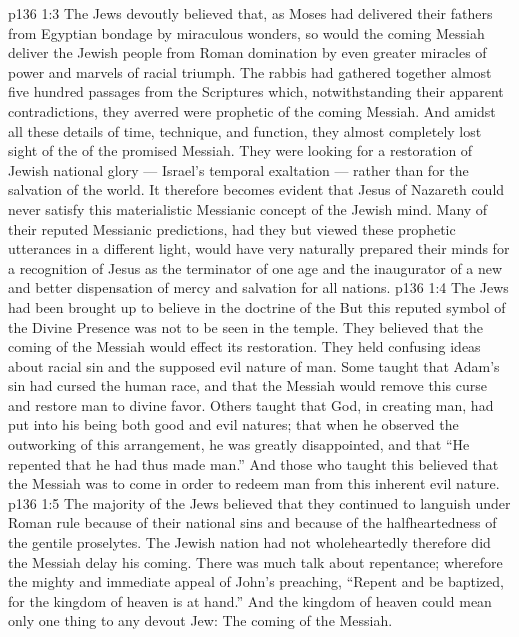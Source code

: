 \vs p136 1:3 The Jews devoutly believed that, as Moses had delivered their fathers from Egyptian bondage by miraculous wonders, so would the coming Messiah deliver the Jewish people from Roman domination by even greater miracles of power and marvels of racial triumph. The rabbis had gathered together almost five hundred passages from the Scriptures which, notwithstanding their apparent contradictions, they averred were prophetic of the coming Messiah. And amidst all these details of time, technique, and function, they almost completely lost sight of the  of the promised Messiah. They were looking for a restoration of Jewish national glory --- Israel’s temporal exaltation --- rather than for the salvation of the world. It therefore becomes evident that Jesus of Nazareth could never satisfy this materialistic Messianic concept of the Jewish mind. Many of their reputed Messianic predictions, had they but viewed these prophetic utterances in a different light, would have very naturally prepared their minds for a recognition of Jesus as the terminator of one age and the inaugurator of a new and better dispensation of mercy and salvation for all nations.
\vs p136 1:4 \pc The Jews had been brought up to believe in the doctrine of the  But this reputed symbol of the Divine Presence was not to be seen in the temple. They believed that the coming of the Messiah would effect its restoration. They held confusing ideas about racial sin and the supposed evil nature of man. Some taught that Adam’s sin had cursed the human race, and that the Messiah would remove this curse and restore man to divine favor. Others taught that God, in creating man, had put into his being both good and evil natures; that when he observed the outworking of this arrangement, he was greatly disappointed, and that “He repented that he had thus made man.” And those who taught this believed that the Messiah was to come in order to redeem man from this inherent evil nature.
\vs p136 1:5 The majority of the Jews believed that they continued to languish under Roman rule because of their national sins and because of the halfheartedness of the gentile proselytes. The Jewish nation had not wholeheartedly  therefore did the Messiah delay his coming. There was much talk about repentance; wherefore the mighty and immediate appeal of John’s preaching, “Repent and be baptized, for the kingdom of heaven is at hand.” And the kingdom of heaven could mean only one thing to any devout Jew: The coming of the Messiah.
